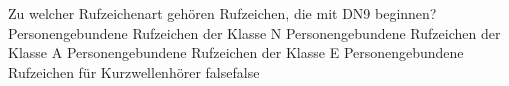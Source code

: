    {Zu welcher Rufzeichenart gehören Rufzeichen, die mit DN9 beginnen?}
    {Personengebundene Rufzeichen der Klasse N}
    {Personengebundene Rufzeichen der Klasse A}
    {Personengebundene Rufzeichen der Klasse E}
    {Personengebundene Rufzeichen für Kurzwellenhörer}
    {false}{false}